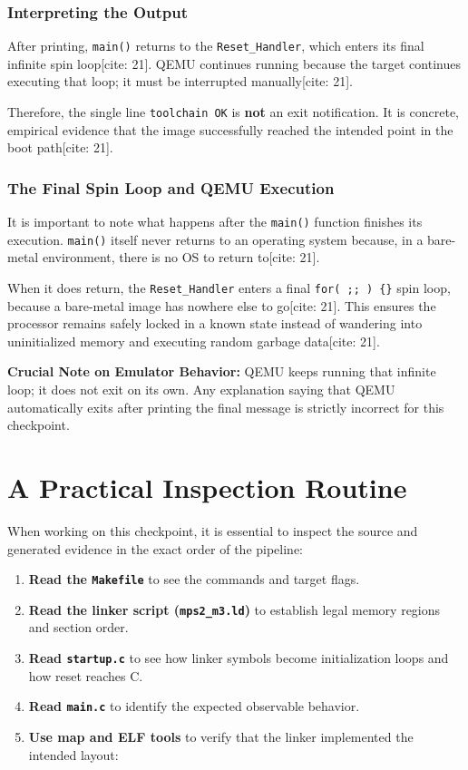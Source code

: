 \subsubsection{Interpreting the Output}
After printing, \texttt{main()} returns to the \texttt{Reset\_Handler}, which enters its final infinite spin loop[cite: 21]. QEMU continues running because the target continues executing that loop; it must be interrupted manually[cite: 21]. 

Therefore, the single line \texttt{toolchain OK} is \textbf{not} an exit notification. It is concrete, empirical evidence that the image successfully reached the intended point in the boot path[cite: 21].

\subsubsection{The Final Spin Loop and QEMU Execution}
It is important to note what happens after the \texttt{main()} function finishes its execution. \texttt{main()} itself never returns to an operating system because, in a bare-metal environment, there is no OS to return to[cite: 21]. 

When it does return, the \texttt{Reset\_Handler} enters a final \texttt{for( ;; ) \{\}} spin loop, because a bare-metal image has nowhere else to go[cite: 21]. This ensures the processor remains safely locked in a known state instead of wandering into uninitialized memory and executing random garbage data[cite: 21].

\textbf{Crucial Note on Emulator Behavior:} QEMU keeps running that infinite loop; it does not exit on its own. Any explanation saying that QEMU automatically exits after printing the final message is strictly incorrect for this checkpoint.

\section{A Practical Inspection Routine}
When working on this checkpoint, it is essential to inspect the source and generated evidence in the exact order of the pipeline:
\begin{enumerate}
    \item \textbf{Read the \texttt{Makefile}} to see the commands and target flags.
    \item \textbf{Read the linker script (\texttt{mps2\_m3.ld})} to establish legal memory regions and section order.
    \item \textbf{Read \texttt{startup.c}} to see how linker symbols become initialization loops and how reset reaches C.
    \item \textbf{Read \texttt{main.c}} to identify the expected observable behavior.
    \item \textbf{Use map and ELF tools} to verify that the linker implemented the intended layout:
\end{enumerate}

